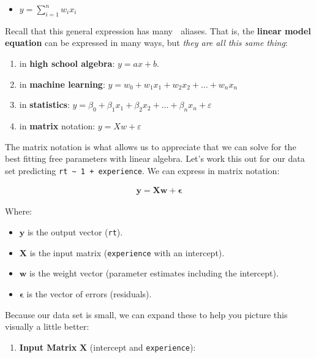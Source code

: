 \documentclass[
  letterpaper,
  DIV=11,
  numbers=noendperiod]{scrartcl}
\providecommand{\tightlist}{%
  \setlength{\itemsep}{0pt}\setlength{\parskip}{0pt}}\usepackage{longtable,booktabs,array}
\begin{document}
\begin{itemize}
\tightlist
\item
  \(y=\sum_{i=1}^{n}w_ix_i\)
\end{itemize}

Recall that this general expression has many 🥸 aliases. That is, the
\textbf{linear model equation} can be expressed in many ways, but
\emph{they are all this same thing}:

\begin{enumerate}
\def\labelenumi{\arabic{enumi}.}
\tightlist
\item
  in \textbf{high school algebra}: \(y=ax+b\).
\item
  in \textbf{machine learning}:
  \(y = w_0 + w_1x_1 + w_2x_2 + ... + w_nx_n\)
\item
  in \textbf{statistics}:
  \(y = β_0 + β_1x_1 + β_2x_2 + ... + β_nx_n + ε\)
\item
  in \textbf{matrix} notation: \(y = Xw + ε\)
\end{enumerate}

The matrix notation is what allows us to appreciate that we can solve
for the best fitting free parameters with linear algebra. Let's work
this out for our data set predicting
\texttt{rt\ \textasciitilde{}\ 1\ +\ experience}. We can express in
matrix notation:

\[
\begin{aligned}
    \mathbf{y} = \mathbf{X} \mathbf{w} + \mathbf{\epsilon}
\end{aligned}
\]

Where:

\begin{itemize}
\tightlist
\item
  \(\mathbf{y}\) is the output vector (\texttt{rt}).
\item
  \(\mathbf{X}\) is the input matrix (\texttt{experience} with an
  intercept).
\item
  \(\mathbf{w}\) is the weight vector (parameter estimates including the
  intercept).
\item
  \(\boldsymbol{\epsilon}\) is the vector of errors (residuals).
\end{itemize}

Because our data set is small, we can expand these to help you picture
this visually a little better:

\begin{enumerate}
\def\labelenumi{\arabic{enumi}.}
\tightlist
\item
  \textbf{Input Matrix} \(\mathbf{X}\) (intercept and
  \texttt{experience}):
\end{enumerate}
\end{document}
